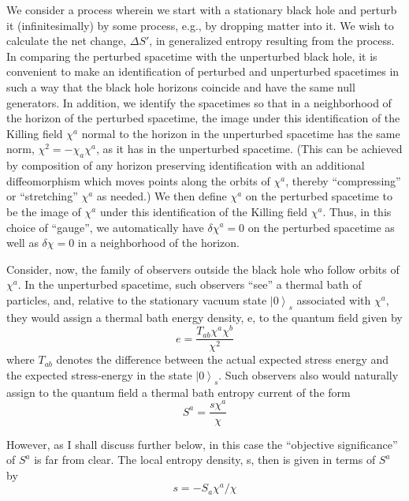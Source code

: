 \documentclass[11pt,a4paper]{article}
\providecommand{\ket}[1]{\left\lvert#1\right\rangle}
\begin{document}
We consider a process wherein we start with a stationary black hole and perturb it (infinitesimally) by some process, e.g., by dropping matter into it. We wish to calculate the net change, \(\Delta S'\), in generalized entropy resulting from the process. In comparing the perturbed spacetime with the unperturbed black hole, it is convenient to make an identification of perturbed and unperturbed spacetimes in such a way that the black hole horizons coincide and have the same null generators. In addition, we identify the spacetimes so that in a neighborhood of the horizon of the perturbed spacetime, the image under this identification of the Killing field \(\chi^a\) normal to the horizon in the unperturbed spacetime has the same norm, \(\chi^2 = -\chi_a \chi^a\), as it has in the unperturbed spacetime. (This can be achieved by composition of any horizon preserving identification with an additional diffeomorphism which moves points along the orbits of \(\chi^a\), thereby ``compressing'' or ``stretching'' \(\chi^a\) as needed.) We then define \(\chi^a\) on the perturbed spacetime to be the image of \(\chi^a\) under this identification of the Killing field \(\chi^a\). Thus, in this choice of ``gauge'', we automatically have \(\delta \chi^a = 0\) on the perturbed spacetime as well as \(\delta \chi = 0\) in a neighborhood of the horizon.

Consider, now, the family of observers outside the black hole who follow orbits of \(\chi^a\). In the unperturbed spacetime, such observers ``see'' a thermal bath of particles, and, relative to the stationary vacuum state \(\ket0_s\) associated with \(\chi^a\), they would assign a thermal bath energy density, e, to the quantum field given by
\begin{equation*}
e=\frac{T_{ab}\chi^a\chi^b}{\chi^2} \tag{7.2.24}\label{eq:7.2.24}
\end{equation*}
where \(T_{ab}\) denotes the difference between the actual expected stress energy and the expected stress-energy in the state \(\ket0_s\). Such observers also would naturally assign to the quantum field a thermal bath entropy current of the form
\begin{equation*}
S^a=\frac{s\chi^a}{\chi} \tag{7.2.25}\label{eq:7.2.25}
\end{equation*}

However, as I shall discuss further below, in this case the ``objective significance'' of \(S^a\) is far from clear. The local entropy density, s, then is given in terms of \(S^a\) by
\begin{equation*}
s = -S_a \chi^a / \chi \tag{7.2.26}\label{eq:7.2.26}
\end{equation*}
\end{document}
